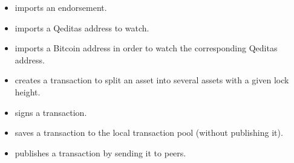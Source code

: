 \begin{itemize}
\item {} imports an endorsement.
\item {} imports a Qeditas address to watch.
\item {} imports a Bitcoin address in order to watch the corresponding Qeditas address.
\item {} creates a transaction to split an asset
into several assets with a given lock height.
\item {} signs a transaction.
\item {} saves a transaction to the local transaction pool (without publishing it).
\item {} publishes a transaction by sending it to peers.
\end{itemize}

